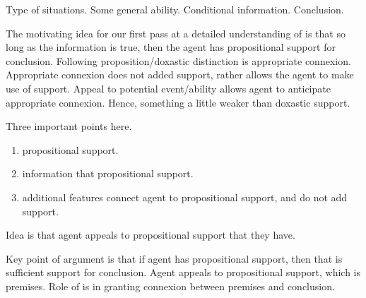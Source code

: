 \begin{note}[Recap]
  Type of situations.
  Some general ability.
  Conditional information.
  Conclusion.
\end{note}

\begin{note}
  The motivating idea for our first pass at a detailed understanding of \WR{} is that so long as the information is true, then the agent has propositional support for conclusion.
  Following proposition/doxastic distinction is appropriate connexion.
  Appropriate connexion does not added support, rather allows the agent to make use of support.
  Appeal to potential event/ability allows agent to anticipate appropriate connexion.
  Hence, something a little weaker than doxastic support.

  Three important points here.
  \begin{enumerate}
  \item propositional support.
  \item information that propositional support.
  \item additional features connect agent to propositional support, and do not add support.
  \end{enumerate}

  Idea is that agent appeals to propositional support that they have.

  Key point of argument is that if agent has propositional support, then that is sufficient support for conclusion.
  Agent appeals to propositional support, which is premises.
  Role of \WR{} is in granting connexion between premises and conclusion.
\end{note}

